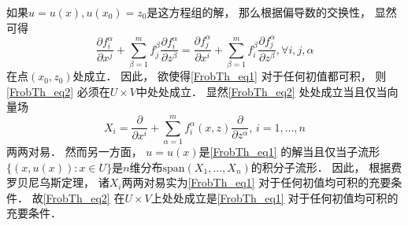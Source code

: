 如果$u=u(x),u(x_0)=z_0$是这方程组的解， 那么根据偏导数的交换性， 显然可得
\begin{equation}\label{FrobTh_eq2}
\frac{\partial f_i^\alpha}{\partial x^j}+\sum_{\beta=1}^mf_j^\beta\frac{\partial f_i^\alpha}{\partial z^\beta}
=\frac{\partial f_j^\alpha}{\partial x^i}+\sum_{\beta=1}^mf_i^\beta\frac{\partial f_j^\alpha}{\partial z^\beta},\forall i,j,\alpha
\end{equation}
在点$(x_0,z_0)$处成立． 因此， 欲使得\autoref{FrobTh_eq1} 对于任何初值都可积， 则\autoref{FrobTh_eq2} 必须在$U\times V$中处处成立． 显然\autoref{FrobTh_eq2} 处处成立当且仅当向量场
$$
X_i=\frac{\partial}{\partial x^i}+\sum_{\alpha=1}^mf_i^\alpha(x,z)\frac{\partial}{\partial z^\alpha},\,i=1,...,n
$$
两两对易． 然而另一方面， $u=u(x)$是\autoref{FrobTh_eq1} 的解当且仅当子流形$\{(x,u(x)):x\in U\}$是$n$维分布$\text{span}(X_1,...,X_n)$的积分子流形． 因此， 根据费罗贝尼乌斯定理， 诸$X_i$两两对易实为\autoref{FrobTh_eq1} 对于任何初值均可积的充要条件． 故\autoref{FrobTh_eq2} 在$U\times V$上处处成立是\autoref{FrobTh_eq1} 对于任何初值均可积的充要条件．
